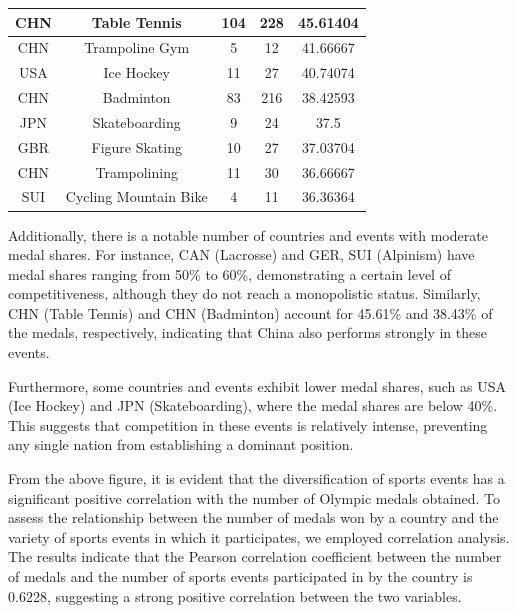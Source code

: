 \documentclass{mcmthesis}
\begin{document}
\begin{table}[H]
\begin{tabular}{|c|c|c|c|c|}
\hline
CHN              & Table Tennis          & 104                     & 228                            & 45.61404                 \\ 
\hline
CHN              & Trampoline Gym        & 5                       & 12                             & 41.66667                 \\ 
\hline
USA              & Ice Hockey            & 11                      & 27                             & 40.74074                 \\ 
\hline
CHN              & Badminton             & 83                      & 216                            & 38.42593                 \\ 
\hline
JPN              & Skateboarding         & 9                       & 24                             & 37.5                     \\ 
\hline
GBR              & Figure Skating        & 10                      & 27                             & 37.03704                 \\ 
\hline
CHN              & Trampolining          & 11                      & 30                             & 36.66667                 \\ 
\hline
SUI              & Cycling Mountain Bike & 4                       & 11                             & 36.36364                 \\
\hline
\end{tabular}
\end{table}
Additionally, there is a notable number of countries and events with moderate medal shares. For instance, CAN (Lacrosse) and GER, SUI (Alpinism) have medal shares ranging from 50\% to 60\%, demonstrating a certain level of competitiveness, although they do not reach a monopolistic status. Similarly, CHN (Table Tennis) and CHN (Badminton) account for 45.61\% and 38.43\% of the medals, respectively, indicating that China also performs strongly in these events.

Furthermore, some countries and events exhibit lower medal shares, such as USA (Ice Hockey) and JPN (Skateboarding), where the medal shares are below 40\%. This suggests that competition in these events is relatively intense, preventing any single nation from establishing a dominant position.


From the above figure, it is evident that the diversification of sports events has a significant positive correlation with the number of Olympic medals obtained. To assess the relationship between the number of medals won by a country and the variety of sports events in which it participates, we employed correlation analysis. The results indicate that the Pearson correlation coefficient between the number of medals and the number of sports events participated in by the country is 0.6228, suggesting a strong positive correlation between the two variables.
\end{document}
